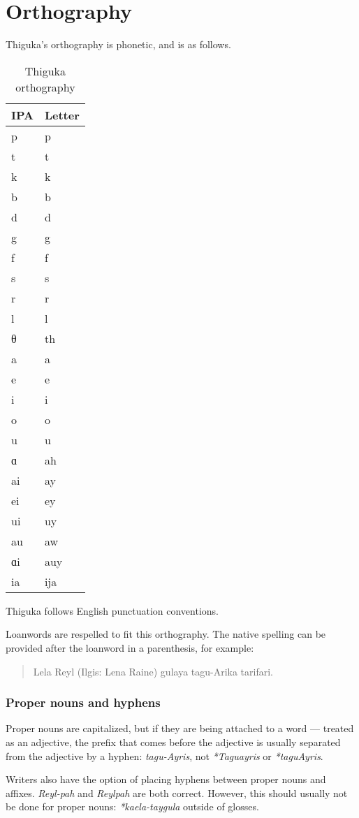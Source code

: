 
\newpage
\section{Orthography}
Thiguka's orthography is phonetic, and is as follows.

\begin{table}[h!]
    \centering
    \caption{Thiguka orthography}
    \begin{tabularx}{4cm}{|X|X|}
        \hline
        \textbf{IPA} & \textbf{Letter} \\
        \hline
        p & p \\
        t & t \\
        k & k \\
        b & b \\
        d & d \\
        g & g \\
        f & f \\
        s & s \\
        r & r \\
        l & l \\
        θ & th \\
        a & a \\
        e & e \\
        i & i \\
        o & o \\
        u & u \\
        ɑ & ah \\
        ai & ay \\
        ei & ey \\
        ui & uy \\
        au & aw \\
        ɑi & auy \\
        ia & ija \\
        \hline
    \end{tabularx}
\end{table}

Thiguka follows English punctuation conventions.  

Loanwords are respelled to fit this orthography. The native spelling can be provided after the loanword in a parenthesis, for example:

\begin{quotation}
    Lela Reyl (Ilgis: Lena Raine) gulaya tagu-Arika tarifari.
\end{quotation}

\subsubsection{Proper nouns and hyphens}
Proper nouns are capitalized, but if they are being attached to a word --- treated as an adjective, the prefix that comes before the adjective is usually separated from the adjective by a hyphen: \emph{tagu-Ayris}, not \emph{*Taguayris} or \emph{*taguAyris}.

Writers also have the option of placing hyphens between proper nouns and affixes. \emph{Reyl-pah} and \emph{Reylpah} are both correct. However, this should usually not be done for proper nouns: \emph{*kaela-taygula} outside of glosses.
